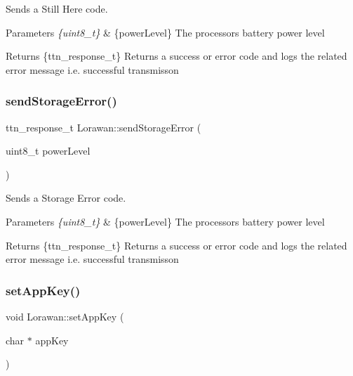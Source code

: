 Sends a \textquotesingle{}Still Here\textquotesingle{} code. 
\begin{DoxyParams}{Parameters}
{\em \{uint8\+\_\+t\}} & \{power\+Level\} The processor\textquotesingle{}s battery power level \\
\hline
\end{DoxyParams}
\begin{DoxyReturn}{Returns}
\{ttn\+\_\+response\+\_\+t\} Returns a success or error code and logs the related error message i.\+e. \textquotesingle{}successful transmisson\textquotesingle{} 
\end{DoxyReturn}
\mbox{\label{class_lorawan_a8d5565a2257a87ad9b39d78ea2ad38b8}} 
\subsubsection{\texorpdfstring{send\+Storage\+Error()}{sendStorageError()}}
{\footnotesize\ttfamily ttn\+\_\+response\+\_\+t Lorawan\+::send\+Storage\+Error (\begin{DoxyParamCaption}\item[{uint8\+\_\+t}]{power\+Level }\end{DoxyParamCaption})}

Sends a Storage Error code. 
\begin{DoxyParams}{Parameters}
{\em \{uint8\+\_\+t\}} & \{power\+Level\} The processor\textquotesingle{}s battery power level \\
\hline
\end{DoxyParams}
\begin{DoxyReturn}{Returns}
\{ttn\+\_\+response\+\_\+t\} Returns a success or error code and logs the related error message i.\+e. \textquotesingle{}successful transmisson\textquotesingle{} 
\end{DoxyReturn}
\mbox{\label{class_lorawan_a0971c9c87d2a731bb5779953243a7016}} 
\subsubsection{\texorpdfstring{set\+App\+Key()}{setAppKey()}}
{\footnotesize\ttfamily void Lorawan\+::set\+App\+Key (\begin{DoxyParamCaption}\item[{char $\ast$}]{app\+Key }\end{DoxyParamCaption})}

